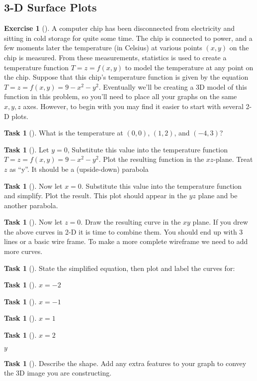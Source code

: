\documentclass[10pt,]{book}
\theoremstyle{plain}
\theoremstyle{definition}
\theoremstyle{definition}
\theoremstyle{definition}
\theoremstyle{definition}
\newtheorem{exploration}[project]{Exercise}
\newtheorem{task}[project]{Task}
\theoremstyle{definition}
\numberwithin{equation}{section}
\begin{document}
\subsection[{3-D Surface Plots}]{3-D Surface Plots}\label{subsection-22}
\begin{exploration}[]\label{prob_3dsurface_plot}
\larsonfive{ } A computer chip has been disconnected from electricity and sitting in cold storage for quite some time. The chip is connected to power, and a few moments later the temperature (in Celsius) at various points \((x,y)\) on the chip is measured. From these measurements, statistics is used to create a temperature function \(T=z=f(x,y)\) to model the temperature at any point on the chip. Suppose that this chip's temperature function is given by the equation \(T=z=f(x,y)=9-x^2-y^2\). Eventually we'll be creating a 3D model of this function in this problem, so you'll need to place all your graphs on the same \(x,y,z\) axes. However, to begin with you may find it easier to start with several 2-D plots.%
\begin{task}[]\label{task-203}
What is the temperature at \((0,0)\), \((1,2)\), and \((-4,3)\)?  %
\end{task}
\begin{task}[]\label{task-204}
Let \(y=0\), Substitute this value into the temperature function \(T=z=f(x,y)=9-x^2-y^2\). Plot the resulting function in the \(xz\)-plane. Treat \(z\) as ``y''. It should be a (upside-down) parabola%
%
\end{task}
\begin{task}[]\label{task-205}
Now let \(x=0\). Substitute this value into the temperature function and simplify. Plot the result. This plot should appear in the \(yz\) plane and be another parabola.%
\end{task}
\begin{task}[]\label{task-206}
Now let \(z=0\). Draw the resulting curve in the \(xy\) plane. If you drew the above curves in 2-D it is time to combine them. You should end up with 3 lines or a basic wire frame. To make a more complete wireframe we need to add more curves.%
\end{task}
\begin{task}[]\label{task-207}
State the simplified equation, then plot and label the curves for:%
\begin{task}[]\label{task-208}
\(x=-2\)%
\end{task}
\begin{task}[]\label{task-209}
\(x=-1\)%
\end{task}
\begin{task}[]\label{task-210}
\(x=1\)%
\end{task}
\begin{task}[]\label{task-211}
\(x=2\)%
\end{task}
\(y\)\begin{task}[]\label{task-212}
Describe the shape. Add any extra features to your graph to convey the 3D image you are constructing.  %
\end{task}
\end{task}
\end{exploration}
\typeout{************************************************}
\typeout{************************************************}
\end{document}
